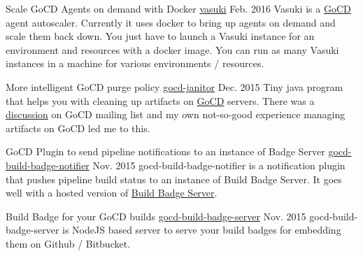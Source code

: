 
\begin{cventries}

  \cventry
    {Scale GoCD Agents on demand with Docker} %
    {\href{https://github.com/ashwanthkumar/vasuki}{vasuki}} %
    {Feb. 2016} %
    {} %
    {
    Vasuki is a \href{https://www.go.cd/}{GoCD} agent autoscaler. Currently it uses docker to bring up agents on demand and scale them back down.
    You just have to launch a Vasuki instance for an environment and resources with a docker image.
    You can run as many Vasuki instances in a machine for various environments / resources.
    }

  \cventry
    {More intelligent GoCD purge policy} %
    {\href{https://github.com/ashwanthkumar/gocd-janitor}{gocd-janitor}} %
    {Dec. 2015} %
    {} %
    {
    Tiny java program that helps you with cleaning up artifacts on \href{https://go.cd/}{GoCD} servers.
    There was a \href{https://groups.google.com/forum/#!topic/go-cd/HfOY_74OKhI/discussion}{discussion} on GoCD mailing list and
    my own not-so-good experience managing artifacts on GoCD led me to this.
    }

  \cventry
    {GoCD Plugin to send pipeline notifications to an instance of Badge Server} %
    {\href{https://github.com/ashwanthkumar/gocd-build-badge-notifier}{gocd-build-badge-notifier}} %
    {Nov. 2015} %
    {} %
    {
    gocd-build-badge-notifier is a notification plugin that pushes pipeline build status to an instance of Build Badge Server.
    It goes well with a hosted version of \href{https://github.com/ashwanthkumar/gocd-build-badge-server}{Build Badge Server}.
    }

  \cventry
    {Build Badge for your GoCD builds} %
    {\href{https://github.com/ashwanthkumar/gocd-build-badge-server}{gocd-build-badge-server}} %
    {Nov. 2015} %
    {} %
    {
    gocd-build-badge-server is NodeJS based server to serve your build badges for embedding them on Github / Bitbucket.
    }


\end{cventries}
